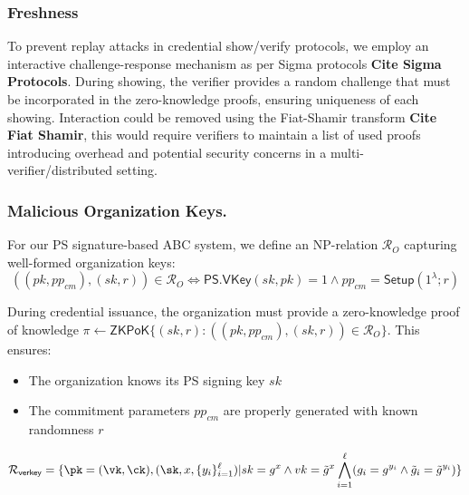 
\subsubsection{Freshness}
To prevent replay attacks in credential show/verify protocols, we employ an interactive challenge-response mechanism as per Sigma protocols \textbf{Cite Sigma Protocols}. During showing, the verifier provides a random challenge that must be incorporated in the zero-knowledge proofs, ensuring uniqueness of each showing. Interaction could be removed using the Fiat-Shamir transform \textbf{Cite Fiat Shamir}, this would require verifiers to maintain a list of used proofs introducing overhead and potential security concerns in a multi-verifier/distributed setting.

\subsubsection{Malicious Organization Keys.}
For our PS signature-based ABC system, we define an NP-relation $\mathcal{R}_O$ capturing well-formed organization keys:
$$ ((pk, pp_{cm}), (sk, r)) \in \mathcal{R}_O \iff \mathsf{PS.VKey}(sk, pk) = 1 \land pp_{cm} = \mathsf{Setup}(1^\lambda; r) $$

During credential issuance, the organization must provide a zero-knowledge proof of knowledge 
$\pi \gets \mathsf{ZKPoK}\{(sk,r): ((pk, pp_{cm}), (sk,r)) \in \mathcal{R}_O\}$. 
This ensures:
\begin{itemize}
    \item The organization knows its PS signing key $sk$
    \item The commitment parameters $pp_{cm}$ are properly generated with known randomness $r$
\end{itemize}



        \[
        \mathcal{R}_{\mathsf{verkey}} = \{\pk = (\vk, \ck),(\sk, x, \{y_i\}_{i=1}^\ell) | sk = g^x \wedge vk = \tilde{g}^x \bigwedge_{i=1}^\ell (g_i = g^{y_i} \wedge \tilde{g}_i = \tilde{g}^{y_i})\}
        \]





